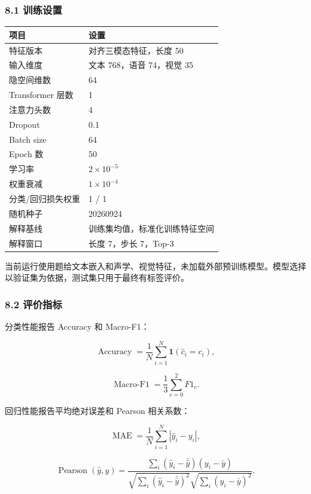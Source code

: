 \documentclass[
  12pt,
  a4paper,
]{ctexart}
\begin{document}
\hypertarget{ux8badux7ec3ux8bbeux7f6e}{%
\subsubsection{8.1 训练设置}\label{ux8badux7ec3ux8bbeux7f6e}}

\begin{longtable}[]{@{}ll@{}}
\toprule
项目 & 设置 \\
\midrule
\endhead
特征版本 & 对齐三模态特征，长度 50 \\
输入维度 & 文本 768，语音 74，视觉 35 \\
隐空间维数 & 64 \\
Transformer 层数 & 1 \\
注意力头数 & 4 \\
Dropout & 0.1 \\
Batch size & 64 \\
Epoch 数 & 50 \\
学习率 & \(2\times10^{-5}\) \\
权重衰减 & \(1\times10^{-4}\) \\
分类/回归损失权重 & 1 / 1 \\
随机种子 & 20260924 \\
解释基线 & 训练集均值，标准化训练特征空间 \\
解释窗口 & 长度 7，步长 7，Top-3 \\
\bottomrule
\end{longtable}

当前运行使用题给文本嵌入和声学、视觉特征，未加载外部预训练模型。模型选择以验证集为依据，测试集只用于最终有标签评价。

\hypertarget{ux8bc4ux4ef7ux6307ux6807}{%
\subsubsection{8.2 评价指标}\label{ux8bc4ux4ef7ux6307ux6807}}

分类性能报告 Accuracy 和 Macro-F1：

\[
\operatorname{Accuracy}=\frac{1}{N}\sum_{i=1}^{N}
\mathbf 1(\hat c_i=c_i),
\tag{24}
\]

\[
\operatorname{Macro\text{-}F1}=\frac{1}{3}\sum_{c=0}^{2}F1_c.
\tag{25}
\]

回归性能报告平均绝对误差和 Pearson 相关系数：

\[
\operatorname{MAE}=\frac{1}{N}\sum_{i=1}^{N}
|\hat y_i-y_i|,
\tag{26}
\]

\[
\operatorname{Pearson}(\hat y,y)=
\frac{\sum_i(\hat y_i-\bar{\hat y})(y_i-\bar y)}
{\sqrt{\sum_i(\hat y_i-\bar{\hat y})^2}
\sqrt{\sum_i(y_i-\bar y)^2}}.
\tag{27}
\]
\end{document}
